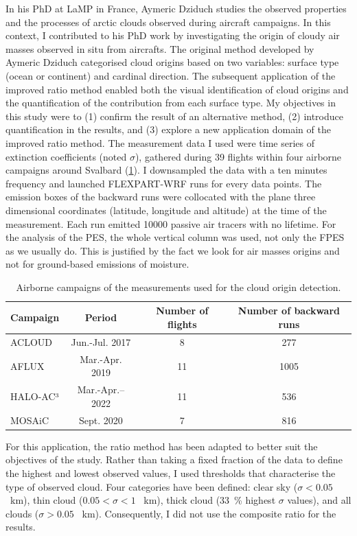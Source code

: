     In his PhD at LaMP in France, Aymeric Dziduch studies the observed properties and the processes of arctic clouds observed during aircraft campaigns. In this context, I contributed to his PhD work by investigating the origin of cloudy air masses observed in situ from aircrafts.
The original method developed by Aymeric Dziduch categorised cloud origins based on two variables: surface type (ocean or continent) and cardinal direction. The subsequent application of the improved ratio method enabled both the visual identification of cloud origins and the quantification of the contribution from each surface type.  
     My objectives in this study were to (1) confirm the result of an alternative method, (2) introduce quantification in the results, and (3) explore a new application domain of the improved ratio method.
    The measurement data I used were time series of extinction coefficients (noted $\sigma$), gathered during 39 flights within four airborne campaigns around Svalbard (\cref{tab:mpc2_campaigns}).
    I downsampled the data with a ten minutes frequency and launched FLEXPART-WRF runs for every data points.
    The emission boxes of the backward runs were collocated with the plane three dimensional coordinates (latitude, longitude and altitude) at the time of the measurement. Each run emitted \num{10000} passive air tracers with no lifetime. 
For the analysis of the PES, the whole vertical column was used, not only the FPES as we usually do. This is justified by the fact we look for air masses origins and not for ground-based emissions of moisture.

\begin{table}[ht!]
    \centering
    \begin{tabular}{l|c|c|c}
        \toprule
        \textbf{Campaign}  &  \textbf{Period} &  \textbf{Number of flights} & \textbf{Number of backward runs} \\
        \midrule 
        ACLOUD & Jun.\--Jul. 2017 & 8 & 277 \\
        AFLUX & Mar.\--Apr. 2019 & 11 & 1005 \\
        HALO-AC³ & Mar.\--Apr.\--- 2022 & 11 & 536 \\
        MOSAiC & Sept. 2020 & 7 & 816 \\
    \bottomrule
    \end{tabular}
    \caption{Airborne campaigns of the measurements used for the cloud origin detection.}
    \label{tab:mpc2_campaigns}
\end{table}

For this application, the ratio method has been adapted to better suit the objectives of the study.
Rather than taking a fixed fraction of the data to define the highest and lowest observed values, I used thresholds that characterise the type of observed cloud. Four categories have been defined: clear sky ($\sigma < 0.05$ \si{\per\km}), thin cloud ($0.05 < \sigma < 1$ \si{\per\km}), thick cloud (\SI{33}{\percent} highest $\sigma$ values), and all clouds ($\sigma > 0.05$ \si{\per\km}).
Consequently, I did not use the composite ratio for the results.
\vspace{\baselineskip}

